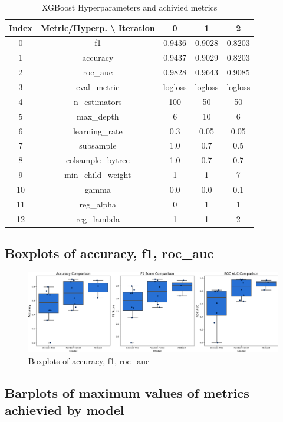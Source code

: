 \documentclass{article}%
\begin{document}
%


\begin{table}[h!]%
\caption{XGBoost Hyperparameters and achivied metrics}%
\vspace{0.2cm}%
\centering%
\begin{tabular}{|c||c||c||c||c|}%
\hline%
Index&Metric/Hyperp. \textbackslash{} Iteration&0&1&2\\%
\hline%
0&f1&0.9436&0.9028&0.8203\\%
1&accuracy&0.9437&0.9029&0.8203\\%
2&roc\_auc&0.9828&0.9643&0.9085\\%
3&eval\_metric&logloss&logloss&logloss\\%
4&n\_estimators&100&50&50\\%
5&max\_depth&6&10&6\\%
6&learning\_rate&0.3&0.05&0.05\\%
7&subsample&1.0&0.7&0.5\\%
8&colsample\_bytree&1.0&0.7&0.7\\%
9&min\_child\_weight&1&1&7\\%
10&gamma&0.0&0.0&0.1\\%
11&reg\_alpha&0&1&1\\%
12&reg\_lambda&1&1&2\\%
\hline%
\end{tabular}%
\end{table}

%
\newpage%
\subsection{Boxplots of accuracy, f1, roc\_auc}%
\label{subsec:Boxplotsofaccuracy,f1,rocauc}%


\begin{figure}[h!]%
\centering%
\includegraphics[width=460px]{ModelOptimization/box_plots_metrics.png}%
\caption{Boxplots of accuracy, f1, roc\_auc}%
\end{figure}

%
\subsection{Barplots of maximum values of metrics achievied by model}%
\label{subsec:Barplotsofmaximumvaluesofmetricsachieviedbymodel}%
\end{document}
